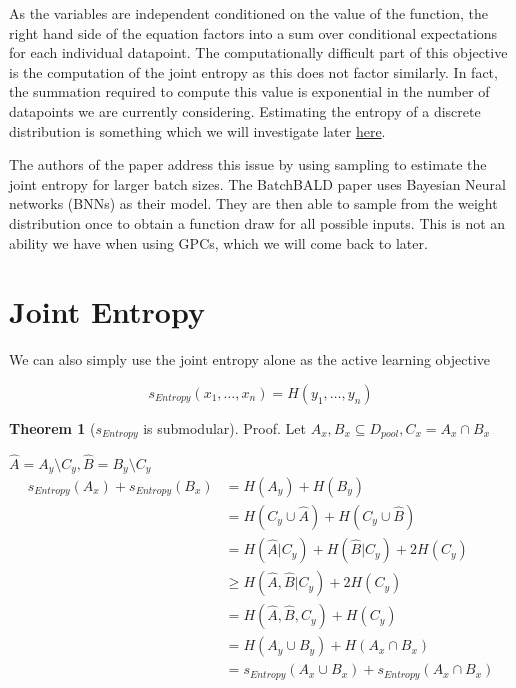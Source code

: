 \documentclass[12pt, a4paper]{report}
\theoremstyle{definition}
\newtheorem{theorem}{Theorem}
\begin{document}
As the variables are independent conditioned on the value of the function, the right hand side of the equation factors into a sum over conditional expectations for each individual datapoint. The computationally difficult part of this objective is the computation of the joint entropy as this does not factor similarly. In fact, the summation required to compute this value is exponential in the number of datapoints we are currently considering. Estimating the entropy of a discrete distribution is something which we will investigate later \hyperref[sec:Entropy]{here}.


The authors of the paper address this issue by using sampling to estimate the joint entropy for larger batch sizes. The BatchBALD paper uses Bayesian Neural networks (BNNs) as their model. They are then able to sample from the weight distribution once to obtain a function draw for all possible inputs. This is not an ability we have when using GPCs, which we will come back to later.


\section{Joint Entropy}

We can also simply use the joint entropy alone as the active learning objective

$$s_{Entropy} (x_1, \ldots, x_n) = H(y_1, \ldots, y_n)$$

\begin{theorem}[$s_{Entropy}$ is submodular]
    Proof.
    Let $A_x,B_x \subseteq D_{pool}, C_x = A_x \cap B_x$
    
    $\hat{A} = A_y \setminus C_y, \hat{B} = B_y \setminus C_y$
    \begin{align*}
        s_{Entropy} (A_x) + s_{Entropy} (B_x) &= H(A_y) + H(B_y)\\
        &= H(C_y \cup \hat{A}) + H(C_y \cup \hat{B})\\
        &= H(\hat{A} | C_y) + H(\hat{B} | C_y) + 2 H(C_y)\\
        &\geq H(\hat{A}, \hat{B} | C_y) + 2 H(C_y)\\
        &= H(\hat{A}, \hat{B}, C_y) + H(C_y)\\
        &= H(A_y \cup B_y) + H(A_x \cap B_x)\\
        &= s_{Entropy} (A_x \cup B_x) + s_{Entropy} (A_x \cap B_x)
    \end{align*}

\end{theorem}
\end{document}
